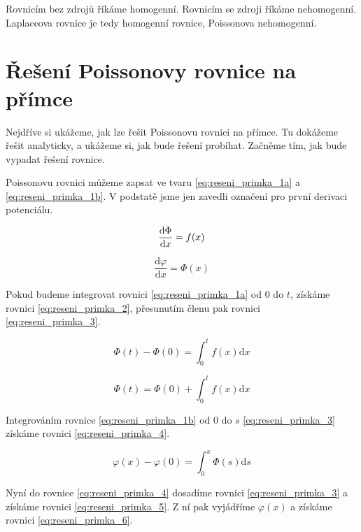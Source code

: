 \documentclass{book}
\begin{document}
\begin{fact}
Rovnicím bez zdrojů říkáme homogenní. Rovnicím se zdroji říkáme nehomogenní. Laplaceova rovnice je tedy homogenní rovnice, Poissonova
nehomogenní.
\end{fact}

\chapter{Řešení Poissonovy rovnice na přímce}

Nejdříve si ukážeme, jak lze řešit Poissonovu rovnici na přímce. Tu dokážeme řešit analyticky, a ukážeme si, jak bude řešení probíhat.
Začněme tím, jak bude vypadat řešení rovnice.

Poissonovu rovnici můžeme zapsat ve tvaru \eqref{eq:reseni_primka_1a} a \eqref{eq:reseni_primka_1b}. V podstatě jsme jen zavedli označení pro první derivaci potenciálu.

\begin{equation}
\label{eq:reseni_primka_1a}
\frac{\mathrm{d} \Phi}{\mathrm{d} x} = f(x) \\
\end{equation}

\begin{equation}
\label{eq:reseni_primka_1b}
\frac{\mathrm{d} \varphi}{\mathrm{d} x} = \Phi(x)
\end{equation}


Pokud budeme integrovat rovnici \eqref{eq:reseni_primka_1a} od \(0\) do \(t\), získáme rovnici \eqref{eq:reseni_primka_2}, přesunutím členu pak rovnici \eqref{eq:reseni_primka_3}.

\begin{equation}
\label{eq:reseni_primka_2}
\Phi(t) - \Phi(0) = \int_0^t f(x) \mathrm{d}x
\end{equation}

\begin{equation}
\label{eq:reseni_primka_3}
\Phi(t) = \Phi(0) + \int_0^t f(x) \mathrm{d}x
\end{equation}

Integrováním rovnice \eqref{eq:reseni_primka_1b} od \(0\) do \(s\) \eqref{eq:reseni_primka_3} získáme rovnici \eqref{eq:reseni_primka_4}.

\begin{equation}
\label{eq:reseni_primka_4}
\varphi(x) - \varphi(0) = \int_0^x \Phi(s) \mathrm{d}s
\end{equation}

Nyní do rovnice \eqref{eq:reseni_primka_4} dosadíme rovnici \eqref{eq:reseni_primka_3} a získáme rovnici \eqref{eq:reseni_primka_5}. Z ní pak vyjádříme
\(\varphi(x)\) a získáme rovnici \eqref{eq:reseni_primka_6}.
\end{document}
